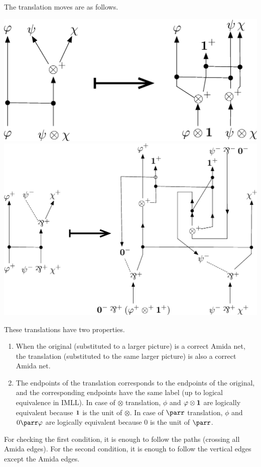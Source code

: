 The translation moves are as follows.
 \begin{center}
\includegraphics[scale=0.4]{tensor-move.eps}
\\
\includegraphics[scale=0.35]{parr-move.eps}
 \end{center}
These translations have two properties.
\begin{enumerate}
 \item When the original (substituted to a larger picture)
       is a correct Amida net, the translation (substituted to the same
       larger picture) is also a correct Amida net.
 \item The endpoints of the translation corresponds to the endpoints of
       the original, and the corresponding endpoints have the same label
       (up to logical equivalence in IMLL).  In case of $\otimes$
       translation, $\phi$ and
       $\varphi\otimes \mathbf{1}$ are logically equivalent because $\mathbf{1}$ is the
       unit of $\otimes$.
       In case of $\parr$ translation, $\phi$ and $0\parr \phi$ are
       logically equivalent because $0$ is the unit of $\parr$.
\end{enumerate}
For checking the first condition, it is enough to follow the paths
(crossing all Amida edges).
For the second condition, it is enough to follow the vertical edges
except the Amida edges.

